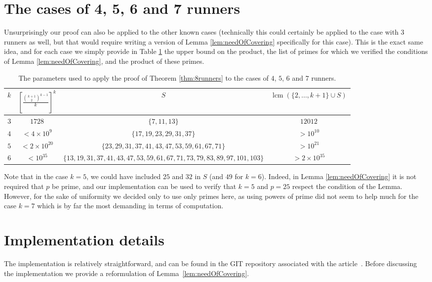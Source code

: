 \documentclass[11pt,a4paper]{article}
\theoremstyle{definition}
\theoremstyle{remark}
\DeclareMathOperator{\lcm}{lcm}
\begin{document}
\section{The cases of 4, 5, 6 and 7 runners}
Unsurprisingly our proof can also be applied to the other known cases (technically this could certainly be applied to the case with 3 runners as well, but that would require writing a version of Lemma \ref{lem:needOfCovering} specifically for this case). This is the exact same idea, and for each case we simply provide in Table \ref{tab:parameters} the upper bound on the product, the list of primes for which we verified the conditions of Lemma \ref{lem:needOfCovering}, and the product of these primes.
\begin{table}[h]
    \footnotesize
    \begin{tabular}{|c|c|c|c|}\hline
         $k$ & $\left[\frac{\binom{k+1}{2}^{k-1}}{k}\right]^k$ & $S$ &  $\lcm(\{2,\ldots,k+1\}\cup S)$\\\hline\hline
         $3$ &  $1728$ & $\{7,11,13\}$& $12012$\\\hline
         $4$ &  $< 4\times 10^9$ & $\{17,19,23,29,31,37\}$& $>10^{10}$\\\hline
         $5$ &  $< 2\times10^{20}$ & $\{23,29,31,37,41,43,47,53,59,61,67,71\}$& $>10^{21}$\\\hline
         $6$ &  $< 10^{35}$ & $\{13, 19, 31, 37, 41, 43, 47, 53, 59, 61, 67, 71, 73, 79, 83, 89, 97, 101, 103\}$& $>2\times 10^{35}$\\\hline
    \end{tabular}
    \caption{The parameters used to apply the proof of Theorem \ref{thm:8runners} to the cases of $4$, $5$, $6$ and $7$ runners\label{tab:parameters}.}
\end{table}

Note that in the case $k=5$, we could have included $25$ and $32$ in $S$ (and $49$ for $k=6$). Indeed, in Lemma \ref{lem:needOfCovering} it is not required that $p$ be prime, and our implementation can be used to verify that  $k=5$ and $p=25$ respect the condition of the Lemma. However, for the sake of uniformity we decided only to use only primes here, as using powers of prime did not seem to help much for the case $k=7$ which is by far the most demanding in terms of computation. 


\section{Implementation details}\label{sec:implementation}
The implementation is relatively straightforward, and can be found in the GIT repository associated with the article~\cite{gitRepo}. Before discussing the implementation we provide a reformulation of Lemma~\ref{lem:needOfCovering}.
\end{document}
